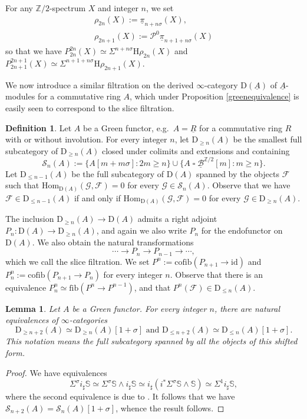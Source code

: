 \documentclass[10pt]{amsart}
\newtheorem{lem}[thm]{Lemma}
\theoremstyle{definition}
\newtheorem{df}[thm]{Definition}
\numberwithin{equation}{section}
\newcommand{\Sphere}{\mathbb{S}}
\newcommand{\Z}{\mathbb{Z}}
\newcommand{\cB}{\mathcal{B}}
\newcommand{\cF}{\mathcal{F}}
\newcommand{\cG}{\mathcal{G}}
\newcommand{\cP}{\mathcal{P}}
\newcommand{\cS}{\mathcal{S}}
\newcommand{\rD}{\mathrm{D}}
\newcommand{\rH}{\mathrm{H}}
\newcommand{\ul}{\underline}
\newcommand{\Hom}{\mathrm{Hom}}
\newcommand{\fib}{\mathrm{fib}}
\newcommand{\cofib}{\mathrm{cofib}}
\newcommand{\id}{\mathrm{id}}
\DeclareMathOperator{\sotimes}{\square}
\begin{document}
For any $\Z/2$-spectrum $X$ and integer $n$,
we set
\begin{gather*}
\rho_{2n}(X)
:=
\ul{\pi}_{n+n\sigma}(X),
\\
\rho_{2n+1}(X)
:=
\cP^0 \ul{\pi}_{n+1+n\sigma}(X)
\end{gather*}
so that we have $P_{2n}^{2n}(X)\simeq \Sigma^{n+n\sigma}\rH \rho_{2n}(X)$ and $P_{2n+1}^{2n+1}(X)\simeq \Sigma^{n+1+n\sigma} \rH \rho_{2n+1}(X)$.

We now introduce a similar filtration on the derived $\infty$-category $\rD(\ul{A})$ of $\ul{A}$-modules for a commutative ring $A$,
which under Proposition \ref{greenequivalence} is easily seen to correspond to the slice filtration.


\begin{df}
\label{abelian rho}
Let $A$ be a Green functor, e.g.\ $A=\ul{R}$ for a commutative ring $R$ with or without involution.
For every integer $n$,
let $\rD_{\geq n}(A)$ be the smallest full subcategory of $\rD_{\geq n}(A)$ closed under colimits and extensions and containing
\[
\cS_n(A)
:=
\{
A[m+m\sigma]
:
2m\geq n
\}
\cup
\{
A\sotimes \ul{\cB}^{\Z/2}[m]
:
m\geq n
\}.
\]
Let $\rD_{\leq n-1}(A)$ be the full subcategory of $\rD(A)$ spanned by the objects $\cF$ such that $\Hom_{\rD(A)}(\cG,\cF)=0$ for every $\cG\in \cS_n(A)$.
Observe that we have $\cF\in \rD_{\leq n-1}(A)$ if and only if $\Hom_{\rD(A)}(\cG,\cF)=0$ for every $\cG\in \rD_{\geq n}(A)$.

The inclusion $\rD_{\geq n}(A)\to \rD(A)$ admits a right adjoint $P_n\colon \rD(A)\to \rD_{\geq n}(A)$, and again we also write $P_n$ for the endofunctor on $\rD(A)$.
We also obtain the natural transformations
\[
\cdots \to P_n \to P_{n-1}\to \cdots,
\]
which we call the slice filtration.
We set $P^n:=\cofib(P_{n+1} \to \id)$ and $P_n^n:=\cofib(P_{n+1}\to P_n)$ for every integer $n$.
Observe that there is an equivalence $P_n^n\simeq \fib(P^n\to P^{n-1})$, 
and that $P^n(\cF) \in \rD_{\leq n}(A)$.
\end{df}

\begin{lem}
\label{shift 2}
Let $A$ be a Green functor.
For every integer $n$,
there are natural equivalences of $\infty$-categories
\[
\rD_{\geq n+2}(A)\simeq \rD_{\geq n}(A)[1+\sigma]
\text{ and }
\rD_{\leq  n+2}(A)\simeq \rD_{\leq n}(A)[1+\sigma].
\]
This notation means the full subcategory spanned by all the objects of this shifted form.
\end{lem}
\begin{proof}
We have equivalences
\[
\Sigma^\sigma i_\sharp \Sphere
\simeq
\Sigma^\sigma \Sphere \wedge i_\sharp \Sphere
\simeq
i_\sharp(i^* \Sigma^\sigma \Sphere \wedge \Sphere)
\simeq
\Sigma^1 i_\sharp \Sphere,
\]
where the second equivalence is due to \cite[Proposition A.1.10]{HP23}.
It follows that we have $\cS_{n+2}(A)=\cS_n(A)[1+\sigma]$,
whence the result follows.
\end{proof}
\end{document}
